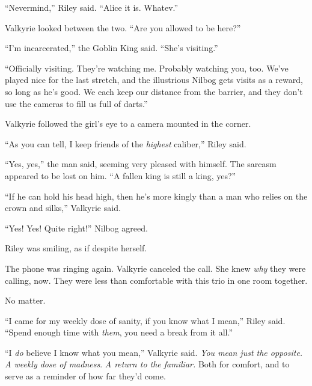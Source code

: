 ``Nevermind,'' Riley said.  ``Alice it is.  Whatev.''



Valkyrie looked between the two.  ``Are you allowed to be here?''



``I'm incarcerated,'' the Goblin King said.  ``She's visiting.''



``Officially visiting.  They're watching me.  Probably watching you, too.  We've played nice for the last stretch, and the illustrious Nilbog gets visits as a reward, so long as he's good.  We each keep our distance from the barrier, and they don't use the cameras to fill us full of darts.''



Valkyrie followed the girl's eye to a camera mounted in the corner.



``As you can tell, I keep friends of the \emph{highest} caliber,'' Riley said.



``Yes, yes,'' the man said, seeming very pleased with himself.  The sarcasm appeared to be lost on him.  ``A fallen king is still a king, yes?''



``If he can hold his head high, then he's more kingly than a man who relies on the crown and silks,'' Valkyrie said.



``Yes!  Yes!  Quite right!'' Nilbog agreed.



Riley was smiling, as if despite herself.



The phone was ringing again.  Valkyrie canceled the call.  She knew \emph{why} they were calling, now.  They were less than comfortable with this trio in one room together.



No matter.



``I came for my weekly dose of sanity, if you know what I mean,'' Riley said.  ``Spend enough time with \emph{them}, you need a break from it all.''



``I \emph{do} believe I know what you mean,'' Valkyrie said.  \emph{You mean just the opposite.  A weekly dose of madness}.  \emph{A return to the familiar.  }Both for comfort, and to serve as a reminder of how far they'd come.



